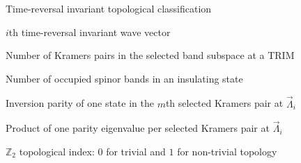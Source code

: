 \begin{thesisfrontmatterentries}
  \item[\(\mathbb{Z}_2\)] Time-reversal invariant topological classification
  \item[\(\vec{\Lambda}_i\)] \(i\)th time-reversal invariant wave vector
  \item[\(N_{\mathrm{p}}\)] Number of Kramers pairs in the selected band subspace at a TRIM
  \item[\(N_{\mathrm{occ}}\)] Number of occupied spinor bands in an insulating state
  \item[\(\xi_{2m}(\vec{\Lambda}_i\,)\)] Inversion parity of one state in the \(m\)th selected Kramers pair at \(\vec{\Lambda}_i\)
  \item[\(\delta_i\)] Product of one parity eigenvalue per selected Kramers pair at \(\vec{\Lambda}_i\)
  \item[\(\nu\)] \(\mathbb{Z}_2\) topological index: \(0\) for trivial and \(1\) for non-trivial topology
\end{thesisfrontmatterentries}

\cleardoublepage
\endgroup
